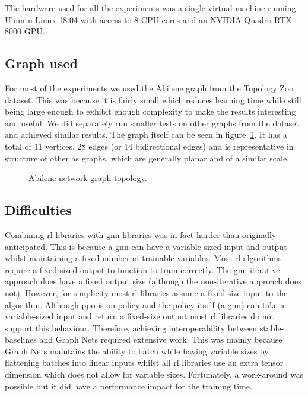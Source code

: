 The hardware used for all the experiments was a single virtual machine running Ubuntu Linux 18.04 with access to 8 CPU cores and an NVIDIA Quadro RTX 8000 GPU.

\subsection{Graph used}

For most of the experiments we used the Abilene graph from the Topology Zoo dataset. This was because it is fairly small which reduces learning time while still being large enough to exhibit enough complexity to make the results interesting and useful. We did separately run smaller tests on other graphs from the dataset and achieved similar results. The graph itself can be seen in figure~\ref{fig:abilene}. It has a total of 11 vertices, 28 edges (or 14 bidirectional edges) and is representative in structure of other \ac{as} graphs, which are generally planar and of a similar scale.

\begin{figure}
    \centering
    \resizebox{\textwidth}{!}{}
    \caption{Abilene network graph topology.}
    \label{fig:abilene}
\end{figure}


\subsection{Difficulties}
Combining \ac{rl} libraries with \ac{gnn} libraries was in fact harder than originally anticipated. This is because a \ac{gnn} can have a variable sized input and output whilst maintaining a fixed number of trainable variables. Most \ac{rl} algorithms require a fixed sized output to function to train correctly. The \ac{gnn} iterative approach does have a fixed output size (although the non-iterative approach does not). However, for simplicity most \ac{rl} libraries assume a fixed size input to the algorithm. Although \ac{ppo} is on-policy and the policy itself (a \ac{gnn}) can take a variable-sized input and return a fixed-size output most \ac{rl} libraries do not support this behaviour. Therefore, achieving interoperability between stable-baselines and Graph Nets required extensive work. This was mainly because Graph Nets maintains the ability to batch while having variable sizes by flattening batches into linear inputs whilst all \ac{rl} libraries use an extra tensor dimension which does not allow for variable sizes. Fortunately, a work-around was possible but it did have a performance impact for the training time.


